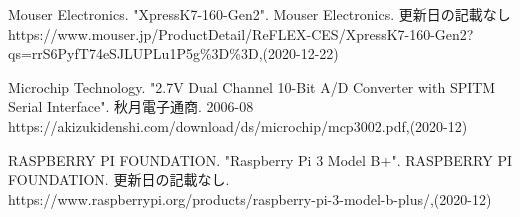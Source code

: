 \begin{thebibliography}{9}
Mouser Electronics. "XpressK7-160-Gen2". Mouser Electronics. 更新日の記載なし
https://www.mouser.jp/ProductDetail/ReFLEX-CES/XpressK7-160-Gen2?qs=rrS6PyfT74eSJLUPLu1P5g\%3D\%3D,(2020-12-22)

Microchip Technology. "2.7V Dual Channel 10-Bit A/D Converter with SPITM Serial Interface". 秋月電子通商. 2006-08
https://akizukidenshi.com/download/ds/microchip/mcp3002.pdf,(2020-12)

RASPBERRY PI FOUNDATION. "Raspberry Pi 3 Model B+". RASPBERRY PI FOUNDATION. 更新日の記載なし.
https://www.raspberrypi.org/products/raspberry-pi-3-model-b-plus/,(2020-12)

\end{thebibliography}

